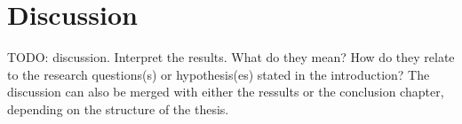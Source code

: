 \chapter{Discussion}\label{chap:discussion}

TODO: discussion. Interpret the results. What do they mean? How do they relate to the research questions(s) or hypothesis(es) stated in the introduction? The discussion can also be merged with either the ressults or the conclusion chapter, depending on the structure of the thesis.